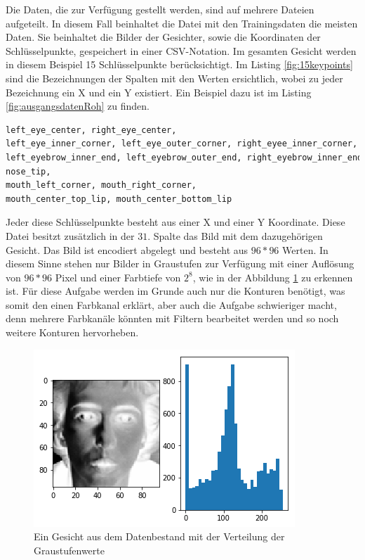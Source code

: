 Die Daten, die zur Verfügung gestellt werden, sind auf mehrere Dateien aufgeteilt. 
In diesem Fall beinhaltet die Datei mit den Trainingsdaten die meisten Daten. 
Sie beinhaltet die Bilder der Gesichter, sowie die Koordinaten der Schlüsselpunkte, gespeichert in einer CSV-Notation. 
Im gesamten Gesicht werden in diesem Beispiel 15 Schlüsselpunkte berücksichtigt. 
Im Listing \ref{fig:15keypoints} sind die Bezeichnungen der Spalten mit den Werten ersichtlich, wobei zu jeder Bezeichnung ein \glqq X\grqq{} und ein \glqq Y\grqq{} existiert.
Ein Beispiel dazu ist im Listing \ref{fig:ausgangsdatenRoh} zu finden.
\begin{lstlisting}[caption={$15$ Schlüsselpunkte im Gesicht eines Menschen},label=fig:15keypoints,captionpos=b,language=Python]
left_eye_center, right_eye_center, 
left_eye_inner_corner, left_eye_outer_corner, right_eyee_inner_corner, right_eye_outer_corner, 
left_eyebrow_inner_end, left_eyebrow_outer_end, right_eyebrow_inner_end, right_eyebrow_outer_end, 
nose_tip, 
mouth_left_corner, mouth_right_corner, 
mouth_center_top_lip, mouth_center_bottom_lip
\end{lstlisting}
Jeder diese Schlüsselpunkte besteht aus einer X und einer Y Koordinate. 
Diese Datei besitzt zusätzlich in der $31.$ Spalte das Bild mit dem dazugehörigen Gesicht.
Das Bild ist encodiert abgelegt und besteht aus $96 * 96$ Werten. 
In diesem Sinne stehen nur Bilder in Graustufen zur Verfügung mit einer Auflösung von $96 * 96$ Pixel und einer Farbtiefe von $2^8$, wie in der Abbildung \ref{fig:ausgangsdaten} zu erkennen ist. 
Für diese Aufgabe werden im Grunde auch nur die Konturen benötigt, was somit den einen Farbkanal erklärt, aber auch die Aufgabe schwieriger macht, denn mehrere Farbkanäle könnten mit Filtern bearbeitet werden und so noch weitere Konturen hervorheben. 
\begin{figure}
	\centering
	\includegraphics[scale=0.75]{images/ausgangsDaten.png}
	\caption{Ein Gesicht aus dem Datenbestand mit der Verteilung der Graustufenwerte}
	\label{fig:ausgangsdaten}
\end{figure}
